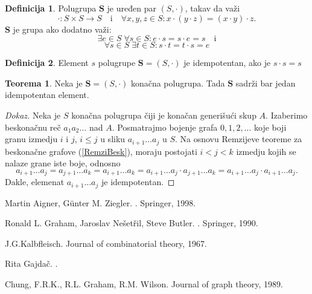 \documentclass{article}
\theoremstyle{definition}
\newtheorem{definicija}{Definicija}[section]
\newtheorem{teorema}{Teorema}[section]
\newcommand{\dokaz}[1]{\begin{proof}[Dokaz]#1\end{proof}}
\begin{document}
	\begin{definicija}
		Polugrupa $\mathbf{S}$ je uređen par $(S,\cdot)$, takav da važi
		\[
		\cdot:S\times S \rightarrow S \quad\mathrm{i}\quad \forall x,y,z\in S: x\cdot (y\cdot z)=(x\cdot y)\cdot z.
		\]
		$\mathbf{S}$ je grupa ako dodatno važi:
		\[
		\exists e\in S\; \forall s \in S: e\cdot s=s\cdot e=s \quad \mathrm{i}
		\]
		\[
		\forall s\in S\; \exists t \in S: s\cdot t=t\cdot s=e
		\]
	\end{definicija}
	\begin{definicija}
		Element $s$ polugrupe $\mathbf{S}=(S,\cdot)$ je idempotentan, ako je $s\cdot s=s$ 
	\end{definicija}
	\begin{teorema}
		Neka je $\mathbf{S}=(S,\cdot)$ konačna polugrupa. Tada $\mathbf{S}$ sadrži bar jedan idempotentan element.
	\end{teorema}
	\dokaz{
		Neka je $S$ konačna polugrupa čiji je konačan generišući skup $A$. Izaberimo beskonačnu reč $a_1 a_2\ldots$ nad $A$. Posmatrajmo bojenje  grafa $0,1,2,\ldots$ koje boji granu izmedju $i$ i $j$, $i\leq j$ u sliku $a_{i+1} \ldots a_j$ u $S$. Na osnovu Remzijeve teoreme za beskonačne grafove (\ref{RemziBesk}), moraju postojati $i<j<k$ izmedju kojih se nalaze grane iste boje, odnosno
		\[
		a_{i+1}\ldots a_j=a_{j+1}\ldots a_k=a_{i+1}\ldots a_k=	a_{i+1}\ldots a_j\cdot 	a_{j+1}\ldots a_k=a_{i+1}\ldots a_j\cdot 	a_{i+1}\ldots a_j.
		\]
		Dakle, elemenat $a_{i+1}\ldots a_j$ je idempotentan.
		
	}
	\newpage
	
	\begin{thebibliography}{99}
		Martin Aigner, Günter M. Ziegler.
		.
		\newblock Springer, 1998.
		
		Ronald L. Graham, Jaroslav Nešetřil, Steve Butler.
		.
		\newblock Springer, 1990.
		
		J.G.Kalbfleisch.
		\newblock Journal of combinatorial theory, 1967.
		
		Rita Gajdač.
		.
		
		Chung, F.R.K., R.L. Graham, R.M. Wilson.
		\newblock Journal of graph theory, 1989.
		
		
		
	\end{thebibliography}	
	
\end{document}

